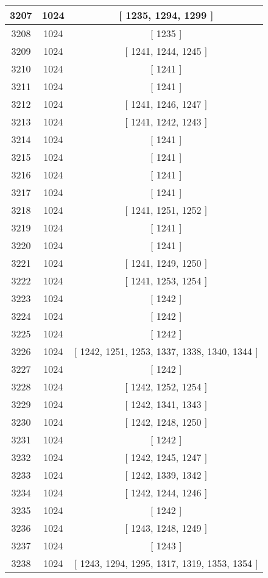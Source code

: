 \begin{center}
\begin{longtable}[H]{|| c c c ||}
\hline
3207 & 1024 & [ 1235, 1294, 1299 ] \\ 
\hline
3208 & 1024 & [ 1235 ] \\ 
\hline
3209 & 1024 & [ 1241, 1244, 1245 ] \\ 
\hline
3210 & 1024 & [ 1241 ] \\ 
\hline
3211 & 1024 & [ 1241 ] \\ 
\hline
3212 & 1024 & [ 1241, 1246, 1247 ] \\ 
\hline
3213 & 1024 & [ 1241, 1242, 1243 ] \\ 
\hline
3214 & 1024 & [ 1241 ] \\ 
\hline
3215 & 1024 & [ 1241 ] \\ 
\hline
3216 & 1024 & [ 1241 ] \\ 
\hline
3217 & 1024 & [ 1241 ] \\ 
\hline
3218 & 1024 & [ 1241, 1251, 1252 ] \\ 
\hline
3219 & 1024 & [ 1241 ] \\ 
\hline
3220 & 1024 & [ 1241 ] \\ 
\hline
3221 & 1024 & [ 1241, 1249, 1250 ] \\ 
\hline
3222 & 1024 & [ 1241, 1253, 1254 ] \\ 
\hline
3223 & 1024 & [ 1242 ] \\ 
\hline
3224 & 1024 & [ 1242 ] \\ 
\hline
3225 & 1024 & [ 1242 ] \\ 
\hline
3226 & 1024 & [ 1242, 1251, 1253, 1337, 1338, 1340, 1344 ] \\ 
\hline
3227 & 1024 & [ 1242 ] \\ 
\hline
3228 & 1024 & [ 1242, 1252, 1254 ] \\ 
\hline
3229 & 1024 & [ 1242, 1341, 1343 ] \\ 
\hline
3230 & 1024 & [ 1242, 1248, 1250 ] \\ 
\hline
3231 & 1024 & [ 1242 ] \\ 
\hline
3232 & 1024 & [ 1242, 1245, 1247 ] \\ 
\hline
3233 & 1024 & [ 1242, 1339, 1342 ] \\ 
\hline
3234 & 1024 & [ 1242, 1244, 1246 ] \\ 
\hline
3235 & 1024 & [ 1242 ] \\ 
\hline
3236 & 1024 & [ 1243, 1248, 1249 ] \\ 
\hline
3237 & 1024 & [ 1243 ] \\ 
\hline
3238 & 1024 & [ 1243, 1294, 1295, 1317, 1319, 1353, 1354 ] \\ 

\end{longtable}
\end{center}
